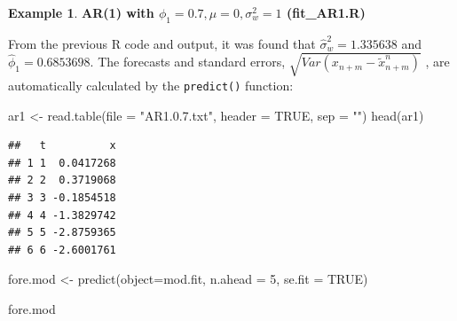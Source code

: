 \documentclass[
]{book}
\newenvironment{Shaded}{\begin{snugshade}}{\end{snugshade}}
\newcommand{\AttributeTok}[1]{\textcolor[rgb]{0.77,0.63,0.00}{#1}}
\newcommand{\ConstantTok}[1]{\textcolor[rgb]{0.00,0.00,0.00}{#1}}
\newcommand{\DecValTok}[1]{\textcolor[rgb]{0.00,0.00,0.81}{#1}}
\newcommand{\FunctionTok}[1]{\textcolor[rgb]{0.00,0.00,0.00}{#1}}
\newcommand{\NormalTok}[1]{#1}
\newcommand{\OtherTok}[1]{\textcolor[rgb]{0.56,0.35,0.01}{#1}}
\newcommand{\SpecialCharTok}[1]{\textcolor[rgb]{0.00,0.00,0.00}{#1}}
\newcommand{\StringTok}[1]{\textcolor[rgb]{0.31,0.60,0.02}{#1}}
\theoremstyle{definition}
\theoremstyle{definition}
\newtheorem{example}{Example}[chapter]
\theoremstyle{definition}
\theoremstyle{definition}
\theoremstyle{remark}
\begin{document}
\begin{example}
\textbf{AR(1) with \(\phi_1=0.7, \mu=0, \sigma_w^2=1\) (fit\_AR1.R)}

From the previous R code and output, it was found that \(\hat \sigma_w^2 = 1.335638\) and \(\hat \phi_1 = 0.6853698\). The forecasts and standard errors, \(\sqrt{Var(x_{n+m}-\tilde x^n_{n+m})}\) , are automatically calculated by the \texttt{predict()} function:

\begin{Shaded}
\begin{Highlighting}[]
\NormalTok{ar1 }\OtherTok{\textless{}{-}} \FunctionTok{read.table}\NormalTok{(}\AttributeTok{file =} \StringTok{"AR1.0.7.txt"}\NormalTok{, }\AttributeTok{header =} \ConstantTok{TRUE}\NormalTok{, }\AttributeTok{sep =} \StringTok{""}\NormalTok{)}
\FunctionTok{head}\NormalTok{(ar1)}
\end{Highlighting}
\end{Shaded}

\begin{verbatim}
##   t          x
## 1 1  0.0417268
## 2 2  0.3719068
## 3 3 -0.1854518
## 4 4 -1.3829742
## 5 5 -2.8759365
## 6 6 -2.6001761
\end{verbatim}

\begin{Shaded}
\end{Shaded}

\begin{Shaded}
\begin{Highlighting}[]
\NormalTok{fore.mod }\OtherTok{\textless{}{-}} \FunctionTok{predict}\NormalTok{(}\AttributeTok{object=}\NormalTok{mod.fit, }\AttributeTok{n.ahead =} \DecValTok{5}\NormalTok{, se.fit }
    \OtherTok{=} \ConstantTok{TRUE}\NormalTok{) }

\NormalTok{fore.mod}
\end{Highlighting}
\end{Shaded}


\end{example}
\end{document}
